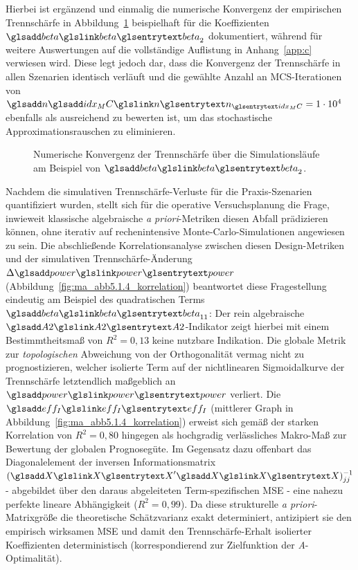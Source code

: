 Hierbei ist ergänzend und einmalig die numerische Konvergenz der empirischen Trennschärfe in Abbildung~\ref{fig:ma_abb5.1.4_powerkonv} beispielhaft für die Koeffizienten $\sym{beta}_2$ dokumentiert, während für weitere Auswertungen auf die vollständige Auflistung in Anhang~\ref{app:c} verwiesen wird. Diese legt jedoch dar, dass die Konvergenz der Trennschärfe in allen Szenarien identisch verläuft und die gewählte Anzahl an \ac{MCS}-Iterationen von $\symsub{n}{idx_MC} = 1\cdot 10^4$ ebenfalls als ausreichend zu bewerten ist, um das stochastische Approximationsrauschen zu eliminieren.

\begin{figure}[htbp]
    \centering
    \setlength{}
    \setlength\figureheight{6cm}
    
    \caption{Numerische Konvergenz der Trennschärfe über die Simulationsläufe am Beispiel von $\sym{beta}_2$.}
    \label{fig:ma_abb5.1.4_powerkonv}
\end{figure}
Nachdem die simulativen Trennschärfe-Verluste für die Praxis-Szenarien quantifiziert wurden, stellt sich für die operative Versuchsplanung die Frage, inwieweit klassische algebraische \textit{a priori}-Metriken diesen Abfall prädizieren können, ohne iterativ auf rechenintensive Monte-Carlo-Simulationen angewiesen zu sein.
Die abschließende Korrelationsanalyse zwischen diesen Design-Metriken und der simulativen Trennschärfe-Änderung $\Delta \sym{power}$ (Abbildung~\ref{fig:ma_abb5.1.4_korrelation}) beantwortet diese Fragestellung eindeutig am Beispiel des quadratischen Terms $\sym{beta}_{11}$:
Der rein algebraische $\sym{A2}$-Indikator zeigt hierbei mit einem Bestimmtheitsmaß von $R^2 = 0{,}13$ keine nutzbare Indikation.
Die globale Metrik zur \textit{topologischen} Abweichung von der Orthogonalität vermag nicht zu prognostizieren, welcher isolierte Term auf der nichtlinearen Sigmoidalkurve der Trennschärfe letztendlich maßgeblich an $\sym{power}$ verliert.
Die $\sym{eff_I}$ (mittlerer Graph in Abbildung~\ref{fig:ma_abb5.1.4_korrelation}) erweist sich gemäß der starken Korrelation von $R^2 = 0{,}80$ hingegen als hochgradig verlässliches Makro-Maß zur Bewertung der globalen Prognosegüte.
Im Gegensatz dazu offenbart das Diagonalelement der inversen Informationsmatrix $(\sym{X}'\sym{X})^{-1}_{jj}$ - abgebildet über den daraus abgeleiteten Term-spezifischen \ac{MSE} - eine nahezu perfekte lineare Abhängigkeit ($R^2 = 0{,}99$).
Da diese strukturelle \textit{a priori}-Matrixgröße die theoretische Schätzvarianz exakt determiniert, antizipiert sie den empirisch wirksamen \ac{MSE} und damit den Trennschärfe-Erhalt isolierter Koeffizienten deterministisch (korrespondierend zur Zielfunktion der \textit{A}-Optimalität).
